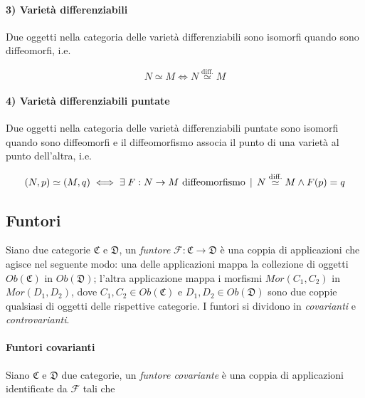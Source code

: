 \paragraph{3) Varietà differenziabili}

Due oggetti nella categoria delle varietà differenziabili sono isomorfi quando sono diffeomorfi, i.e.

\begin{equation}
	N \simeq M \iff N \stackrel{\text{diff.}}{\simeq} M
\end{equation}

\paragraph{4) Varietà differenziabili puntate}

Due oggetti nella categoria delle varietà differenziabili puntate sono isomorfi quando sono diffeomorfi e il diffeomorfismo associa il punto di una varietà al punto dell'altra, i.e.

\begin{equation}
	(N,p) \simeq (M,q) \iff \exists \; F : N \to M \text{ diffeomorfismo} \, \mid \, N \stackrel{\text{diff.}}{\simeq} M \wedge F(p)=q
\end{equation}

\subsection{Funtori}

Siano due categorie $ \mathfrak{C} $ e $ \mathfrak{D} $, un \textit{funtore} $ \mathcal{F} : \mathfrak{C} \to \mathfrak{D} $ è una coppia di applicazioni che agisce nel seguente modo: una delle applicazioni mappa la collezione di oggetti $ Ob(\mathfrak{C}) $ in $ Ob(\mathfrak{D}) $; l'altra applicazione mappa i morfismi $ Mor(C_{1}, C_{2}) $ in $ Mor(D_{1} ,D_{2}) $, dove $ C_{1}, C_{2} \in Ob(\mathfrak{C}) $ e $ D_{1}, D_{2} \in Ob(\mathfrak{D}) $ sono due coppie qualsiasi di oggetti delle rispettive categorie. I funtori si dividono in \textit{covarianti} e \textit{controvarianti}.

\paragraph{Funtori covarianti}

Siano $ \mathfrak{C} $ e $ \mathfrak{D} $ due categorie, un \textit{funtore covariante} è una coppia di applicazioni identificate da $ \mathcal{F} $ tali che

